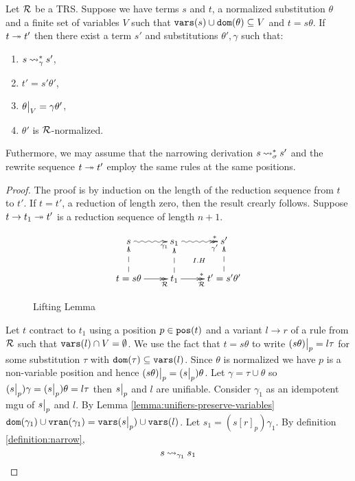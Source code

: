 \begin{lemma}\label{lemma:lifting-lemma-ordinary-narrowing}
	Let $\mathcal{R}$ be a TRS. Suppose we have terms $s$ and $t$, a normalized substitution $\theta$ and a finite set of variables $V$ such that $\mathtt{vars}(s) \cup \mathtt{dom}(\theta) \subseteq V$ and $t = s\theta$. If $t \twoheadrightarrow t'$ then there exist a term $s'$ and substitutions $\theta', \gamma$ such that:
	\begin{enumerate}
		\item $s \mathbin{\rightsquigarrow}^{*}_{\gamma} s'$,
		\item $t' = s'\theta'$,
		\item $\restr{\theta}{V} = \gamma\theta'$,
		\item $\theta'$ is $\mathcal{R}$-normalized.
	\end{enumerate}
	Futhermore, we may assume that the narrowing derivation $s \mathbin{\rightsquigarrow}^{*}_{\sigma} s'$ and the rewrite sequence $t \twoheadrightarrow t'$ employ the same rules at the same positions.

	\begin{proof}
		The proof is by induction on the length of the reduction sequence from $t$ to $t'$. If $t = t'$, a reduction of length zero, then the result crearly follows. Suppose $t \rightarrow t_1 \twoheadrightarrow t'$ is a reduction sequence of length $n+1$.

		\begin{figure}[h!]
			\begin{displaymath}
				\xymatrix{
                    s \ar@{~>}[r]_>>{\gamma_1} & s_1 \ar@{}[dr]|{I.H} \ar@{~>>}[r]_>>{\gamma'}^>>{*} & s' \\
                    t = s\theta \ar@{-->}[u] \ar@{->>}[r]_>>{\trs} & \ar@{-->}[u] t_1 \ar@{->>}[r]_>>{\trs}^>>{*} & t' = s'\theta' \ar@{-->}[u]
				}
			\end{displaymath}
			\caption{Lifting Lemma}
			\label{figure:lifting-lemma}
        \end{figure}

		Let $t$ contract to $t_1$ using a position $p \in \mathtt{pos}(t)$ and a variant $l \rightarrow r$ of a rule from $\mathcal{R}$ such that $\mathtt{vars}(l) \cap V = \emptyset$. We use the fact that $t = s\theta$ to write $\restr{(s\theta)}{p} = l \tau$ for some substitution $\tau$ with $\mathtt{dom}(\tau) \subseteq \mathtt{vars}(l)$. Since $\theta$ is normalized we have $p$ is a non-variable position and hence $\restr{(s\theta)}{p} = (\restr{s}{p})\theta$. Let $\gamma = \tau \cup \theta$ so $(\restr{s}{p})\gamma = (\restr{s}{p})\theta = l \tau$ then $\restr{s}{p}$ and $l$ are unifiable. Consider $\gamma_1$ as an idempotent mgu of $\restr{s}{p}$ and $l$. By Lemma \ref{lemma:unifiers-preserve-variables} $\dom{\gamma_1} \cup \vran{\gamma_1} = \vars{\restr{s}{p}} \cup \vars{l}$. Let $s_1 = (s[r]_p)\gamma_1$. By definition \ref{definition:narrow},
		\begin{equation}\label{lifting-lemma:eqn:s-narrows-s_1}
			s \mathbin{\rightsquigarrow}_{\gamma_1} s_1
		\end{equation}


\end{proof}
\end{lemma}
